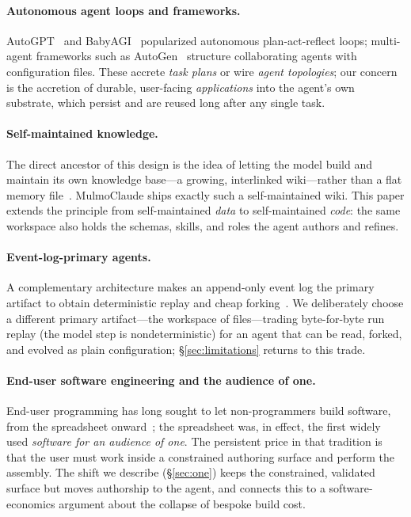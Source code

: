 \documentclass[11pt]{article}
\begin{document}
\paragraph{Autonomous agent loops and frameworks.}
AutoGPT~\citep{autogpt} and BabyAGI~\citep{babyagi} popularized autonomous
plan-act-reflect loops; multi-agent frameworks such as AutoGen~\citep{wu2023autogen}
structure collaborating agents with configuration files. These accrete \emph{task
plans} or wire \emph{agent topologies}; our concern is the accretion of durable,
user-facing \emph{applications} into the agent's own substrate, which persist and
are reused long after any single task.

\paragraph{Self-maintained knowledge.}
The direct ancestor of this design is the idea of letting the model build and
maintain its own knowledge base---a growing, interlinked wiki---rather than a flat
memory file~\citep{karpathy2025kb}. MulmoClaude ships exactly such a self-maintained
wiki. This paper extends the principle from self-maintained \emph{data} to
self-maintained \emph{code}: the same workspace also holds the schemas, skills, and
roles the agent authors and refines.

\paragraph{Event-log-primary agents.}
A complementary architecture makes an append-only event log the primary artifact to
obtain deterministic replay and cheap forking~\citep{ynakajima2026log}. We
deliberately choose a different primary artifact---the workspace of files---trading
byte-for-byte run replay (the model step is nondeterministic) for an agent that can
be read, forked, and evolved as plain configuration; \S\ref{sec:limitations} returns
to this trade.

\paragraph{End-user software engineering and the audience of one.}
End-user programming has long sought to let non-programmers build software, from the
spreadsheet onward~\citep{nardi1993small,ko2011enduser}; the spreadsheet was, in
effect, the first widely used \emph{software for an audience of one}. The persistent
price in that tradition is that the user must work inside a constrained authoring
surface and perform the assembly. The shift we describe (\S\ref{sec:one}) keeps the
constrained, validated surface but moves authorship to the agent, and connects this
to a software-economics argument about the collapse of bespoke build cost.
\end{document}
